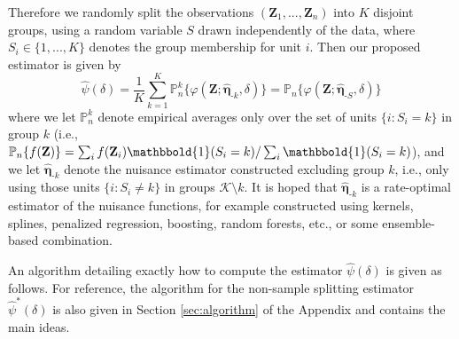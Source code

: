 \documentclass[12pt]{article}
\newcommand{\Pn}{\mathbb{P}_n}
\newcommand{\bZ}{\mathbf{Z}}
\newcommand{\one}{\mathbbold{1}}
\theoremstyle{remark}
\begin{document}
Therefore we randomly split the observations $(\bZ_1,...,\bZ_n)$ into $K$ disjoint groups, using a random variable $S$ drawn independently of the data, where $S_i \in \{1,...,K\}$ denotes the group membership for unit $i$. Then our proposed estimator is given by
$$ \hat\psi(\delta) = \frac{1}{K} \sum_{k=1}^K \Pn^k \{ \varphi(\bZ;\hat{\boldsymbol\eta}_{\text{-}k}, \delta) \} = \Pn \{ \varphi(\bZ; \hat{\boldsymbol\eta}_{\text{-}S}, \delta)\}$$
where we let $\Pn^k$ denote empirical averages only over the set of units $\{i : S_i = k\}$ in group $k$ (i.e., $\Pn\{f(\bZ)\} = \sum_i f(\bZ_i) \one(S_i=k) / \sum_i \one(S_i=k) $), and we let $\hat{\boldsymbol\eta}_{\text{-}k}$ denote the nuisance estimator constructed excluding group $k$, i.e., only using those units $\{i : S_i \neq k\}$ in groups $\mathcal{K} \setminus k$.  It is hoped that $\hat{\boldsymbol\eta}_{\text{-}k}$ is a rate-optimal estimator of the nuisance functions, for example constructed using kernels, splines, penalized regression, boosting, random forests, etc., or some ensemble-based combination.

An algorithm detailing exactly how to compute the estimator $\hat\psi(\delta)$ is given as follows. For reference, the algorithm for the non-sample splitting estimator $\hat\psi^*(\delta)$ is also given in Section \ref{sec:algorithm} of the Appendix and contains the main ideas.
\end{document}

